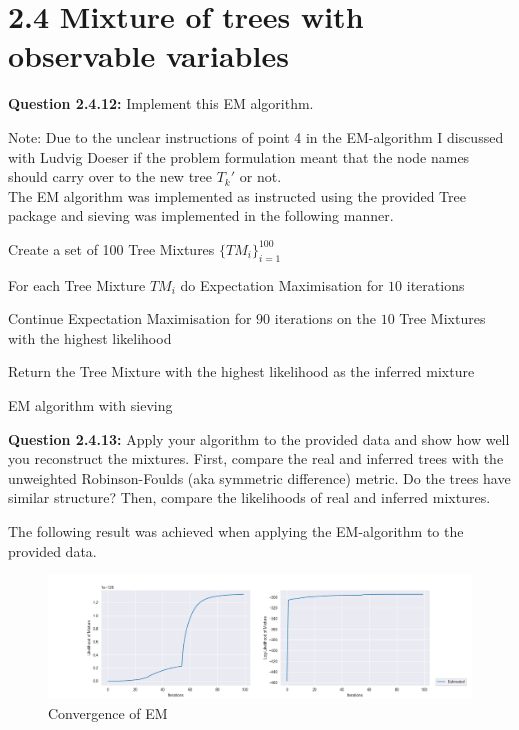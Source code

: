 \section*{2.4 Mixture of trees with observable variables}

\begin{tcolorbox}
\textbf{Question 2.4.12:}
Implement this EM algorithm.
\end{tcolorbox}
Note: Due to the unclear instructions of point 4 in the EM-algorithm I discussed with Ludvig Doeser if the problem formulation meant that the node names should carry over to the new tree $T_k'$ or not.
\\

The EM algorithm was implemented as instructed using the provided Tree package and sieving was implemented in the following manner.

\begin{algorithm}[H]
\SetAlgoLined
{}

  Create a set of 100 Tree Mixtures $ \{ TM_i \}_{i=1}^100$

  For each Tree Mixture $TM_i$ do Expectation Maximisation for $10$ iterations

  Continue Expectation Maximisation for $90$ iterations on the $10$ Tree Mixtures with the highest likelihood

  Return the Tree Mixture with the highest likelihood as the inferred mixture

  \caption{EM algorithm with sieving}
\end{algorithm}

\begin{tcolorbox}
\textbf{Question 2.4.13:}
Apply your algorithm to the provided data and show how well you reconstruct the mixtures. First, compare the real and inferred trees with the unweighted Robinson-Foulds (aka symmetric difference) metric. Do the trees have similar structure? Then, compare the likelihoods of real and inferred mixtures.
\end{tcolorbox}
The following result was achieved when applying the EM-algorithm to the provided data.

\begin{figure}[H]
  \centering
  \includegraphics[width = \linewidth]{em_likelihoods.png}
  \caption{Convergence of EM}
  \label{EM_convergence}
\end{figure}

